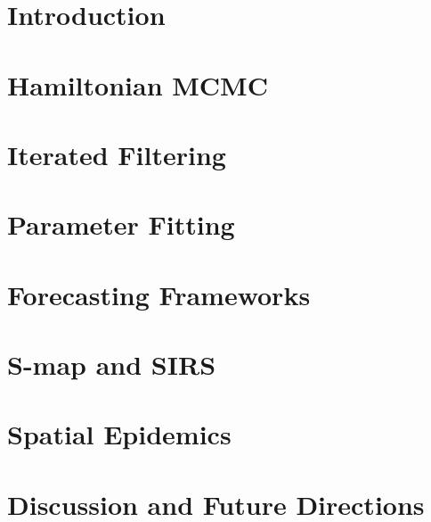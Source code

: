 \documentclass[12pt]{report}
\makeatletter
\let\org@subfile
\renewcommand*{}[1]{%
  \filename@parse{#1}%
  \expandafter
  \graphicspath\expandafter{\expandafter{\filename@area}}%
  \org@subfile{#1}%
}
\makeatother
\begin{document}
	\begin{linenumbers}

	\setcounter{page}{1}

	\chapter{Introduction}

		

	\chapter{Hamiltonian MCMC}

		

	\chapter{Iterated Filtering}

		\graphicspath{{../PF-IF2/}}
		

	\chapter{Parameter Fitting}

		\graphicspath{{../SC1/}}
		

	\chapter{Forecasting Frameworks}

		

	\chapter{S-map and SIRS}

		

	\chapter{Spatial Epidemics}

		

	\chapter{Discussion and Future Directions}


\end{linenumbers}
\end{document}
